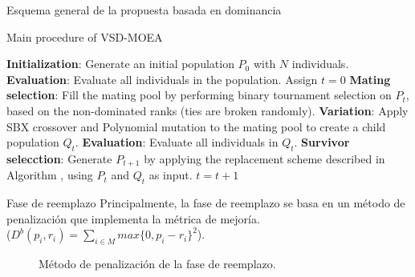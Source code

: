 \documentclass{beamer}
\begin{document}
\begin{frame}{Esquema general de la propuesta basada en dominancia}
    \begin{algorithm}[H]
    \begin{scriptsize}
	\caption{Main procedure of VSD-MOEA} 
	\begin{small}
\begin{algorithmic}[1]
 	\STATE \textbf{Initialization}: Generate an initial population $P_0$ with $N$ individuals.
	\STATE \textbf{Evaluation}: Evaluate all individuals in the population.
	\STATE Assign $t=0$
	   \STATE \textbf{Mating selection}: Fill the mating pool by performing binary tournament selection on $P_t$, 
		 based on the non-dominated ranks (ties are broken randomly).
	   \STATE \textbf{Variation}: Apply SBX crossover and Polynomial mutation to the mating pool to create a child population $Q_t$.
		 \STATE \textbf{Evaluation}: Evaluate all individuals in $Q_t$.
	   \STATE \textbf{Survivor selecction}: Generate $P_{t+1}$ by applying the replacement scheme 
		 described in Algorithm , using $P_t$ and $Q_t$ as input.
	   \STATE $t=t+1$
	\ENDWHILE
	\end{algorithmic}
	\end{small}
\label{alg:vsd-moea}
\end{scriptsize}
\end{algorithm}
\end{frame}

\begin{frame}{Fase de reemplazo}
Principalmente, la fase de reemplazo se basa en un método de penalización que implementa la métrica de mejoría. \\
($D^b(p_i, r_i) = \sum_{i \in M} max\{0, p_i - r_i\}^2$).
\begin{figure}[t]
\centering

\caption{Método de penalización de la fase de reemplazo.} \label{fig:Hypersphere}
\end{figure}
\end{frame}
\end{document}
